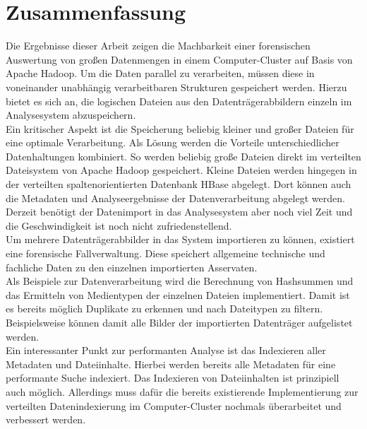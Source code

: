 \chapter{Zusammenfassung}
\label{ch:zusammenfassung}

Die Ergebnisse dieser Arbeit zeigen die Machbarkeit einer forensischen Auswertung von großen Datenmengen in einem Computer-Cluster auf Basis von Apache Hadoop. Um die Daten parallel zu verarbeiten, müssen diese in voneinander unabhängig verarbeitbaren Strukturen gespeichert werden. Hierzu bietet es sich an, die logischen Dateien aus den Datenträgerabbildern einzeln im Analysesystem abzuspeichern.\\
Ein kritischer Aspekt ist die Speicherung beliebig kleiner und großer Dateien für eine optimale Verarbeitung. Als Lösung werden die Vorteile unterschiedlicher Datenhaltungen kombiniert. So werden beliebig große Dateien direkt im verteilten Dateisystem von Apache Hadoop gespeichert. Kleine Dateien werden hingegen in der verteilten spaltenorientierten Datenbank HBase abgelegt. Dort können auch die Metadaten und Analyseergebnisse der Datenverarbeitung abgelegt werden. Derzeit benötigt der Datenimport in das Analysesystem aber noch viel Zeit und die Geschwindigkeit ist noch nicht zufriedenstellend.\\
Um mehrere Datenträgerabbilder in das System importieren zu können, existiert eine forensische Fallverwaltung. Diese speichert allgemeine technische und fachliche Daten zu den einzelnen importierten Asservaten.\\

\noindent
Als Beispiele zur Datenverarbeitung wird die Berechnung von Hashsummen und das Ermitteln von Medientypen der einzelnen Dateien implementiert. Damit ist es bereits möglich Duplikate zu erkennen und nach Dateitypen zu filtern. Beispielsweise können damit alle Bilder der importierten Datenträger aufgelistet werden.\\
Ein interessanter Punkt zur performanten Analyse ist das Indexieren aller Metadaten und Dateiinhalte. Hierbei werden bereits alle Metadaten für eine performante Suche indexiert. Das Indexieren von Dateiinhalten ist prinzipiell auch möglich. Allerdings  muss dafür die bereits existierende Implementierung zur verteilten Datenindexierung im Computer-Cluster nochmals überarbeitet und verbessert werden.\\

